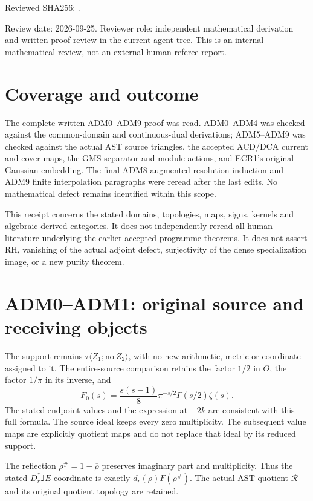Reviewed SHA256:
.

Review date: 2026-09-25. Reviewer role: independent mathematical
derivation and written-proof review in the current agent tree. This is
an internal mathematical review, not an external human referee report.

\section{Coverage and outcome}\label{coverage-and-outcome}

The complete written ADM0--ADM9 proof was read. ADM0--ADM4 was checked
against the common-domain and continuous-dual derivations; ADM5--ADM9
was checked against the actual AST source triangles, the accepted
ACD/DCA current and cover maps, the GMS separator and module actions,
and ECR1's original Gaussian embedding. The final ADM8
augmented-resolution induction and ADM9 finite interpolation paragraphs
were reread after the last edits. No mathematical defect remains
identified within this scope.

This receipt concerns the stated domains, topologies, maps, signs,
kernels and algebraic derived categories. It does not independently
reread all human literature underlying the earlier accepted programme
theorems. It does not assert RH, vanishing of the actual adjoint defect,
surjectivity of the dense specialization image, or a new purity theorem.

\section{ADM0--ADM1: original source and receiving
objects}\label{adm0adm1-original-source-and-receiving-objects}

The support remains \(\tau\langle Z_1;\mathrm{no}\ Z_2\rangle\), with no
new arithmetic, metric or coordinate assigned to it. The entire-source
comparison retains the factor \(1/2\) in \(\Theta\), the factor
\(1/\pi\) in its inverse, and \[
F_0(s)=\frac{s(s-1)}8\pi^{-s/2}\Gamma(s/2)\zeta(s).
\] The stated endpoint values and the expression at \(-2k\) are
consistent with this full formula. The source ideal keeps every zero
multiplicity. The subsequent value maps are explicitly quotient maps and
do not replace that ideal by its reduced support.

The reflection \(\rho^\#=1-\overline\rho\) preserves imaginary part and
multiplicity. Thus the stated \(D_r^*\mathsf J E\) coordinate is exactly
\(\overline{d_r(\rho)}F(\rho^\#)\). The actual AST quotient
\(\mathcal R\) and its original quotient topology are retained.

